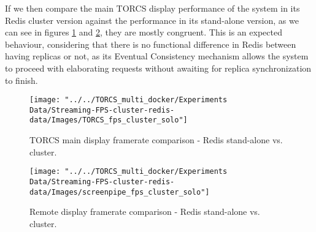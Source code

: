 If we then compare the main TORCS display performance of the system in its Redis cluster version against the performance in its stand-alone version, as we can see in figures \ref{fig:torcs-fps-cluster-solo-redis} and \ref{fig:screenpipe-fps-cluster-solo-redis}, they are mostly congruent. This is an expected behaviour, considering that there is no functional difference in Redis between having replicas or not, as its Eventual Consistency mechanism allows the system to proceed with elaborating requests without awaiting for replica synchronization to finish.
\begin{figure}[h!]
	\centering
	\texttt{[image: "../../TORCS\_multi\_docker/Experiments Data/Streaming-FPS-cluster-redis-data/Images/TORCS\_fps\_cluster\_solo"]}
	\caption[TORCS main display framerate comparison - Redis stand-alone vs. cluster]{TORCS main display framerate comparison - Redis stand-alone vs. cluster.}
	\label{fig:torcs-fps-cluster-solo-redis}
\end{figure}
\begin{figure}[h!]
	\centering
	\texttt{[image: "../../TORCS\_multi\_docker/Experiments Data/Streaming-FPS-cluster-redis-data/Images/screenpipe\_fps\_cluster\_solo"]}
	\caption[Remote display framerate comparison - Redis stand-alone vs. cluster]{Remote display framerate comparison - Redis stand-alone vs. cluster.}
	\label{fig:screenpipe-fps-cluster-solo-redis}
\end{figure}

\pagebreak

